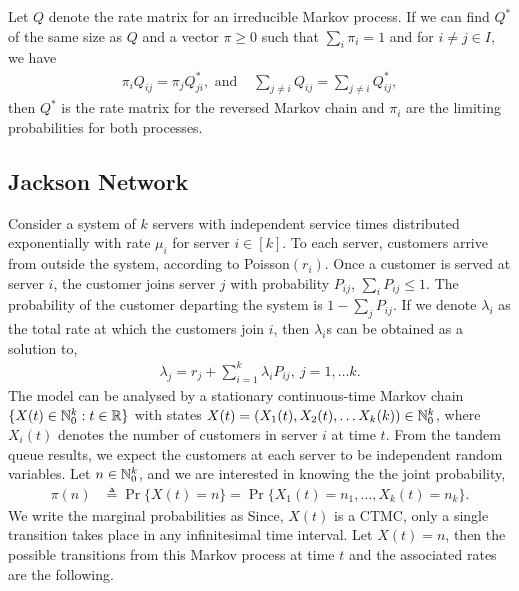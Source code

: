 \documentclass[a4paper,10pt,english]{article}
\begin{document}
\begin{thm}
Let $Q$ denote the rate matrix for an irreducible Markov process. If we can find $Q^*$ of the same size as $Q$ and a vector $\pi \geq 0$ such that $\sum_i \pi_i =1$ and for $i \neq j \in I$, we have
\begin{align*}
\pi_{i}Q_{ij} =\pi_jQ_{ji}^*, \text{ and } &
\sum_{j \neq i}Q_{ij} =\sum_{j \neq i}Q_{ij}^*,
\end{align*} 
then $Q^*$ is the rate matrix for the reversed Markov chain and $\pi_i$ are the limiting probabilities for both  processes.
\end{thm}
\subsection{Jackson Network}
Consider a system of $k$ servers with independent service times distributed exponentially with rate $\mu_i$ for server $i \in [k]$.  
To each server, customers arrive from outside the system, according to Poisson$(r_i)$. Once a customer is served at server $i$, the customer joins server $j$ with probability $P_{ij}$, $\sum_{i}P_{ij} \leq 1$. The probability of the customer departing the system is $1-\sum_{j}P_{ij}$. If we denote $\lambda_i$ as the total rate at which the customers join $i$, then $\lambda_i$s can be obtained as a solution to,
\begin{align*}
\lambda_j=r_j+\sum_{i=1}^{k}\lambda_i P_{ij},~ j=1, \dots k.
\end{align*}
The model can be analysed by a stationary continuous-time Markov chain $\{X(t) \in \mathbb{N}_0^k: t \in \mathbb{R}\}$ with states $X(t) = (X_1(t),X_2(t), \dots X_k(k)) \in \mathbb{N}_0^k$, 
where $X_i(t)$ denotes the number of customers in server $i$ at time $t$. 
From the tandem queue results, we expect the customers at each server to be independent random variables. 
Let $n \in \mathbb{N}_0^k$, and we are interested in knowing the the joint probability,
\begin{align*}
\pi(n) &\triangleq \Pr\{X(t) = n\} = \Pr\{X_1(t) = n_1, \dots, X_k(t) = n_k\}.
\end{align*}
We write the marginal probabilities as 
Since, $X(t)$ is a CTMC, only a single transition takes place in any infinitesimal time interval. 
Let $X(t) = n$, then the possible transitions from this Markov process at time $t$ and the associated rates are the following.  
\end{document}
